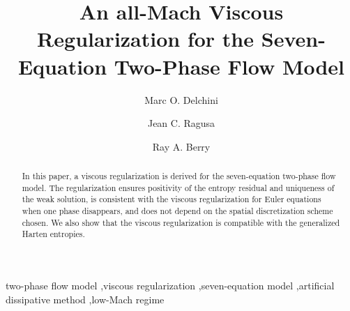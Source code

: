\documentclass[preprint,10pt]{elsarticle}
\begin{document}
\begin{frontmatter}


\title{An all-Mach Viscous Regularization for the Seven-Equation Two-Phase Flow Model}
\author{Marc O. Delchini}
%
\author{Jean C. Ragusa}
%
\author{Ray A. Berry}
%
\address[label1]{Department of Nuclear Engineering, Texas A\&M University, College Station, TX 77843, USA }
%
\address[label2]{Idaho National Laboratory, Idaho Falls, ID 83415, USA }
%
\begin{abstract}
In this paper, a viscous regularization is derived for the seven-equation two-phase flow model. The regularization ensures positivity of the entropy residual and uniqueness of the weak solution, %
is consistent with the viscous regularization for Euler equations when one phase disappears, and does not depend on the spatial discretization scheme chosen. We also show that the viscous regularization is compatible with the generalized Harten entropies.
\end{abstract}
\begin{keyword}
  two-phase flow model \sep viscous regularization \sep seven-equation model \sep artificial dissipative method \sep low-Mach regime  
\end{keyword}
\end{frontmatter}
%
\linenumbers
%
\end{document}
